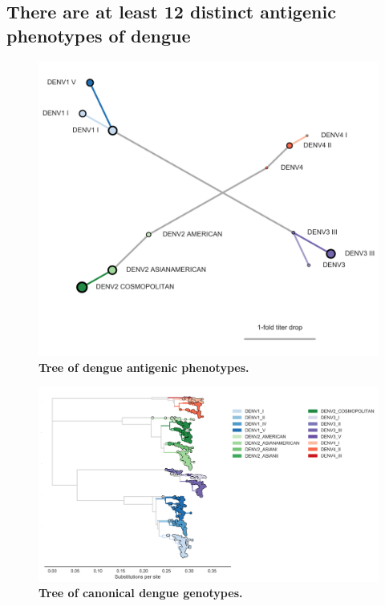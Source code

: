 \documentclass[11pt,oneside,letterpaper]{article}
\begin{document}
\subsection{There are at least 12 distinct antigenic phenotypes of dengue}



\begin{figure}[h]
  \begin{centering}
    \includegraphics[width=.8\linewidth]{../figures/png/antigenic_tree.png}
    \caption{\textbf{Tree of dengue antigenic phenotypes.}}
     \label{antigenic_tree}
  \end{centering}
\end{figure}

\begin{figure}[h]
  \begin{centering}
    \includegraphics[width=\linewidth]{../figures/png/genotype_tree.png}
  	\caption{\textbf{Tree of canonical dengue genotypes.}}
  	\label{genotype_tree}
  \end{centering}
\end{figure}
\end{document}
